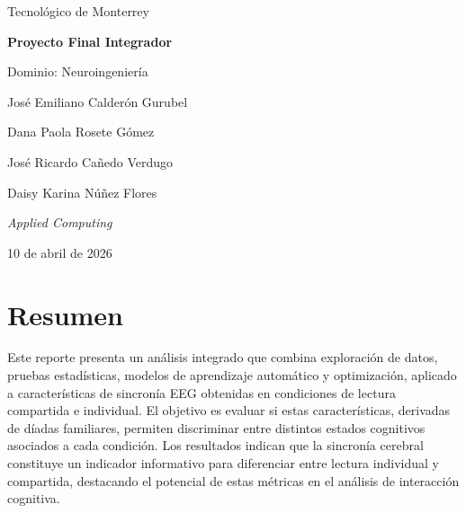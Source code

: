 \documentclass[12pt]{article}
\begin{document}
\begin{titlepage}
    \centering

    \vspace*{1.5cm}

    \vspace{1.3cm}

    {\Large Tecnológico de Monterrey\par}
    \vspace{0.6cm}

    {\Huge \textbf{Proyecto Final Integrador}\par}
    \vspace{0.4cm}

    {\Large Dominio: Neuroingeniería\par}

    \vspace{2cm}

    {\large
    José Emiliano Calderón Gurubel\par
    Dana Paola Rosete Gómez\par
    José Ricardo Cañedo Verdugo\par
    Daisy Karina Núñez Flores\par
    }

    \vspace{1.5cm}

    {\large \textit{Applied Computing}\par}

    \vfill

    {\large 10 de abril de 2026\par}

\end{titlepage}

\section{Resumen}

\vspace{0.3cm}

Este reporte presenta un análisis integrado que combina exploración de datos, pruebas estadísticas, modelos de aprendizaje automático y optimización, aplicado a características de sincronía EEG obtenidas en condiciones de lectura compartida e individual. El objetivo es evaluar si estas características, derivadas de díadas familiares, permiten discriminar entre distintos estados cognitivos asociados a cada condición. Los resultados indican que la sincronía cerebral constituye un indicador informativo para diferenciar entre lectura individual y compartida, destacando el potencial de estas métricas en el análisis de interacción cognitiva.
\end{document}
